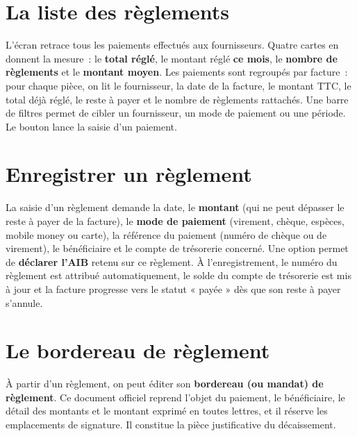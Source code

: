 \section{La liste des règlements}
L'écran  retrace tous les paiements effectués aux fournisseurs. Quatre cartes en donnent la mesure~: le \textbf{total réglé}, le montant réglé \textbf{ce mois}, le \textbf{nombre de règlements} et le \textbf{montant moyen}. Les paiements sont regroupés par facture~: pour chaque pièce, on lit le fournisseur, la date de la facture, le montant TTC, le total déjà réglé, le reste à payer et le nombre de règlements rattachés. Une barre de filtres permet de cibler un fournisseur, un mode de paiement ou une période. Le bouton  lance la saisie d'un paiement.


\section{Enregistrer un règlement}
La saisie d'un règlement demande la date, le \textbf{montant} (qui ne peut dépasser le reste à payer de la facture), le \textbf{mode de paiement} (virement, chèque, espèces, mobile money ou carte), la référence du paiement (numéro de chèque ou de virement), le bénéficiaire et le compte de trésorerie concerné. Une option permet de \textbf{déclarer l'AIB} retenu sur ce règlement. À l'enregistrement, le numéro du règlement est attribué automatiquement, le solde du compte de trésorerie est mis à jour et la facture progresse vers le statut « payée » dès que son reste à payer s'annule.

\section{Le bordereau de règlement}
À partir d'un règlement, on peut éditer son \textbf{bordereau (ou mandat) de règlement}. Ce document officiel reprend l'objet du paiement, le bénéficiaire, le détail des montants et le montant exprimé en toutes lettres, et il réserve les emplacements de signature. Il constitue la pièce justificative du décaissement.
